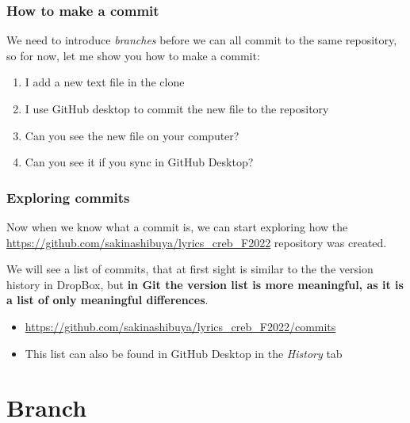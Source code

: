 \documentclass[aspectratio=169]{beamer} %
\newcommand{\trainingURL}[1]{{\color{blue}\url{#1}}}
\newcommand{\traininerUsername}{sakinashibuya}
\newcommand{\repoName}{\traininerUsername/lyrics_creb_F2022}
\newcommand{\trainingRepoURL}[1]{\trainingURL{https://github.com/\repoName #1}}
\begin{document}
\begin{frame}
\frametitle{How to make a commit}

	We need to introduce \textit{branches} before we can all commit to the same repository, so for now, let me show you how to make a commit:

	\begin{enumerate}
		\item I add a new text file in the clone
		\item I use GitHub desktop to commit the new file to the repository
		\item Can you see the new file on your computer?
		\item Can you see it if you sync in GitHub Desktop?
	\end{enumerate}

\end{frame}


\begin{frame}
\frametitle{Exploring commits}

	Now when we know what a commit is, we can start exploring how the \trainingRepoURL{} repository was created.

	\vspace{.25cm}

	We will see a list of commits, that at first sight is similar to the the version history in DropBox, but \textbf{in Git the version list is more meaningful, as it is a list of only meaningful differences}.

	\vspace{.25cm}

	\begin{itemize}
		\item \trainingRepoURL{/commits}
		\item This list can also be found in GitHub Desktop in the \textit{History} tab
	\end{itemize}

\end{frame}

\section{Branch}
\end{document}
